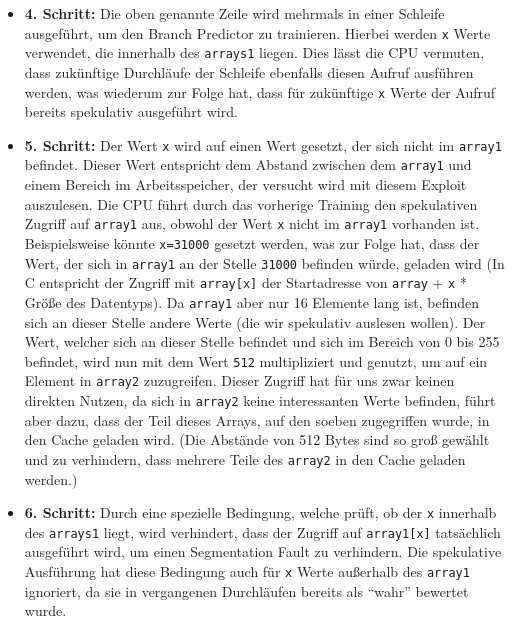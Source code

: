 \begin{itemize}
	\item \textbf{4. Schritt:}\label{itm:step4} Die oben genannte Zeile wird mehrmals in einer Schleife ausgeführt, um den Branch Predictor zu trainieren.
	      Hierbei werden \texttt{x} Werte verwendet, die innerhalb des \texttt{arrays1} liegen.
	      Dies lässt die CPU vermuten, dass zukünftige Durchläufe der Schleife ebenfalls diesen Aufruf ausführen werden, was wiederum zur Folge hat, dass für zukünftige \texttt{x} Werte der Aufruf bereits spekulativ ausgeführt wird.
	\item \textbf{5. Schritt:} Der Wert \texttt{x} wird auf einen Wert gesetzt, der sich nicht im \texttt{array1} befindet.
	      Dieser Wert entspricht dem Abstand zwischen dem \texttt{array1} und einem Bereich im Arbeitsspeicher, der versucht wird mit diesem Exploit auszulesen.
	      Die CPU führt durch das vorherige Training den spekulativen Zugriff auf \texttt{array1} aus, obwohl der Wert \texttt{x} nicht im \texttt{array1} vorhanden ist.
	      Beispielsweise könnte \texttt{x=31000} gesetzt werden, was zur Folge hat, dass der Wert, der sich in \texttt{array1} an der Stelle \texttt{31000} befinden würde, geladen wird (In C entspricht der Zugriff mit \texttt{array[x]} der Startadresse von \texttt{array} + \texttt{x} * Größe des Datentyps).
	      Da \texttt{array1} aber nur 16 Elemente lang ist, befinden sich an dieser Stelle andere Werte (die wir spekulativ auslesen wollen).
	      Der Wert, welcher sich an dieser Stelle befindet und sich im Bereich von 0 bis 255 befindet, wird nun mit dem Wert \texttt{512} multipliziert und genutzt, um auf ein Element in \texttt{array2} zuzugreifen.
	      Dieser Zugriff hat für uns zwar keinen direkten Nutzen, da sich in \texttt{array2} keine interessanten Werte befinden, führt aber dazu, dass der Teil dieses Arrays, auf den soeben zugegriffen wurde, in den Cache geladen wird.
	      (Die Abstände von 512 Bytes sind so groß gewählt und zu verhindern, dass mehrere Teile des \texttt{array2} in den Cache geladen werden.)
	\item \textbf{6. Schritt:} Durch eine spezielle Bedingung, welche prüft, ob der \texttt{x} innerhalb des \texttt{arrays1} liegt, wird verhindert, dass der Zugriff auf \texttt{array1[x]} tatsächlich ausgeführt wird, um einen Segmentation Fault zu verhindern.
	      Die spekulative Ausführung hat diese Bedingung auch für \texttt{x} Werte außerhalb des \texttt{array1} ignoriert, da sie in vergangenen Durchläufen bereits als \enquote{wahr} bewertet wurde.

\end{itemize}
